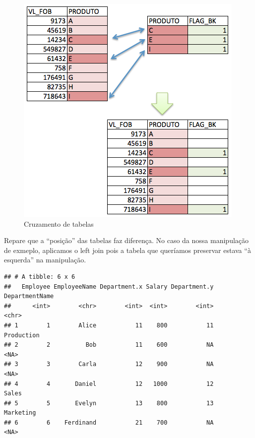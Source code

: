 \documentclass[]{book}
\newenvironment{Shaded}{\begin{snugshade}}{\end{snugshade}}
\newcommand{\KeywordTok}[1]{\textcolor[rgb]{0.13,0.29,0.53}{\textbf{#1}}}
\newcommand{\DataTypeTok}[1]{\textcolor[rgb]{0.13,0.29,0.53}{#1}}
\newcommand{\StringTok}[1]{\textcolor[rgb]{0.31,0.60,0.02}{#1}}
\newcommand{\OperatorTok}[1]{\textcolor[rgb]{0.81,0.36,0.00}{\textbf{#1}}}
\newcommand{\NormalTok}[1]{#1}
\begin{document}
\begin{figure}

{\centering \includegraphics[width=1\linewidth]{imagens/left_join} 

}

\caption{Cruzamento de tabelas}\label{fig:unnamed-chunk-105}
\end{figure}

Repare que a ``posição'' das tabelas faz diferença. No caso da nossa
manipulação de exmeplo, aplicamos o left join pois a tabela que
queríamos preservar estava ``à esquerda'' na manipulação.

\begin{Shaded}
\end{Shaded}

\begin{verbatim}
## # A tibble: 6 x 6
##   Employee EmployeeName Department.x Salary Department.y DepartmentName
##      <int>        <chr>        <int>  <int>        <int>          <chr>
## 1        1        Alice           11    800           11     Production
## 2        2          Bob           11    600           NA           <NA>
## 3        3        Carla           12    900           NA           <NA>
## 4        4       Daniel           12   1000           12          Sales
## 5        5       Evelyn           13    800           13      Marketing
## 6        6    Ferdinand           21    700           NA           <NA>
\end{verbatim}
\end{document}
